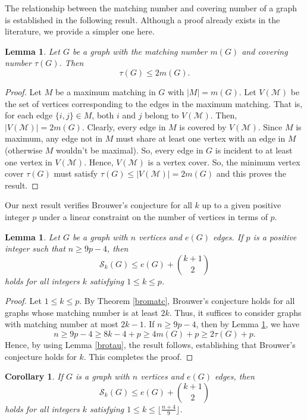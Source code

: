 \documentclass[12pt]{article}
\theoremstyle{plain}
\newtheorem{lemma}[theorem]{Lemma}
\newtheorem{corollary}[theorem]{Corollary}
\theoremstyle{definition}
\begin{document}
The relationship between the matching number and covering number of a graph is established in the following result. Although a proof already exists in the literature, we provide a simpler one here.
\begin{lemma}\label{mat and tau}
Let $G$ be a graph with the matching number $m(G)$ and covering number $\tau(G)$. Then $$\tau(G)\leq 2m(G).$$
\end{lemma} 
\begin{proof}
Let $M$ be a maximum matching in $G$ with $|M|=m(G)$. Let $V(\mathcal{M}) $ be the set of vertices corresponding to the edges in the maximum matching. That is, for each edge $\{i,j\} \in M$, both $i$ and $j$ belong to $V(\mathcal{M})$. Then, $|V(\mathcal{M})|=2m(G)$. Clearly, every edge in $M$ is  covered by $V(\mathcal{M})$. Since $M$ is maximum, any edge not in $M$ must share at least one vertex with an edge in $M$ (otherwise $M$ wouldn't be maximal). So, every edge in $G$ is incident to at least one vertex in $V(\mathcal{M})$. Hence, $V(\mathcal{M})$ is a vertex cover. So, the minimum vertex cover $\tau(G)$ must satisfy $\tau(G)\leq |V(\mathcal{M})|=2m(G)$ and this proves the result.
\end{proof}
Our next result verifies Brouwer’s conjecture for all $k$ up to a given positive integer $p$ under a linear constraint on the number of vertices in terms of $p$.  
\begin{lemma}\label{my1}
Let $G$ be a graph with $n$ vertices and $e(G)$ edges. If $p$ is a positive integer such that $n\geq 9p-4$, then $$\mathcal{S}_k(G)\leq e(G)+\binom{k+1}{2}$$ holds for all integers $k$ satisfying $1\leq k\leq p$.
\end{lemma} 
\begin{proof}
Let $1\leq k\leq p$. By Theorem \ref{bromatc}, Brouwer’s conjecture holds for all graphs whose matching number is at least $2k$. Thus, it suffices to consider graphs with matching number at most $2k-1$. If $n\geq 9p-4$, then by Lemma \ref{mat and tau}, we have  $$n\geq 9p-4\geq 8k-4+p\geq 4m(G)+p\geq 2\tau(G)+p.$$  
Hence, by using Lemma \ref{brotau}, the result follows, establishing that Brouwer’s conjecture holds for $k$. This completes the proof.
\end{proof}
\begin{corollary}\label{prince}
If $G$ is a graph with $n$ vertices and $e(G)$ edges, then $$\mathcal{S}_k(G)\leq e(G)+\binom{k+1}{2}$$ holds for all integers $k$ satisfying $1\leq k\leq\lfloor \frac{ n+4} {9}\rfloor$.
\end{corollary} 
\end{document}
